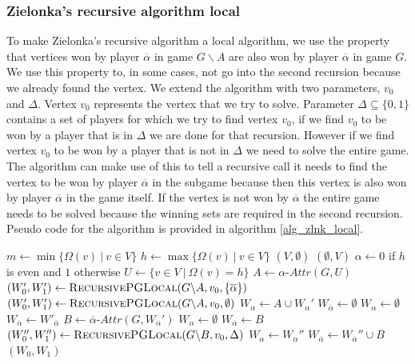 \subsubsection{Zielonka's recursive algorithm local}
\label{sec:zlnk_org_local}
To make Zielonka's recursive algorithm a local algorithm, we use the property that vertices won by player $\overline{\alpha}$ in game $G \backslash A$ are also won by player $\overline{\alpha}$ in game $G$. We use this property to, in some cases, not go into the second recursion because we already found the vertex. We extend the algorithm with two parameters, $v_0$ and $\Delta$. Vertex $v_0$ represents the vertex that we try to solve. Parameter $\Delta \subseteq \{0,1\}$ contains a set of players for which we try to find vertex $v_0$, if we find $v_0$ to be won by a player that is in $\Delta$ we are done for that recursion. However if we find vertex $v_0$ to be won by a player that is not in $\Delta$ we need to solve the entire game. The algorithm can make use of this to tell a recursive call it needs to find the vertex to be won by player $\overline{\alpha}$ in the subgame because then this vertex is also won by player $\overline{\alpha}$ in the game itself. If the vertex is not won by $\overline{\alpha}$ the entire game needs to be solved because the winning sets are required in the second recursion. Pseudo code for the algorithm is provided in algorithm \ref{alg_zlnk_local}.
\begin{algorithm}
	\caption{$\textsc{RecursivePGLocal}(\textit{PG } G = (V,V_0,V_1, E, \Omega),v_0,\Delta)$}
	\label{alg_zlnk_local}
	\begin{algorithmic}[1]
		\State $m \gets \min\{ \Omega(v)\ |\ v \in V\}$
		\State $h \gets\max\{ \Omega(v)\ |\ v \in V\}$
		\State \Return $(V,\emptyset)$
		\Else
		\State \Return $(\emptyset, V)$
		\EndIf
		\EndIf
		\State $\alpha \gets 0$ if $h$ is even and $1$ otherwise
		\State $U \gets \{v \in V\ |\ \Omega(v) = h\}$
		\State $A \gets \alpha\textit{-Attr}(G, U)$
		\If{$\overline{\alpha} \in \Delta$}
		\State $(W_0', W_1') \gets \textsc{RecursivePGLocal}(G \backslash A,v_0,\{\overline{\alpha}\})$
		\Else
		\State $(W_0', W_1') \gets \textsc{RecursivePGLocal}(G \backslash A,v_0,\emptyset)$
		\EndIf
		\State $W_\alpha \gets A \cup W_\alpha'$
		\State $W_{\overline{\alpha}} \gets \emptyset$
		\Else
		\State $W_\alpha \gets \emptyset$
		\State $W_{\overline{\alpha}} \gets W'_{\overline{\alpha}}$
		\Else
		\State $B \gets \overline{\alpha}\textit{-Attr}(G,W_{\overline{\alpha}}')$
		\State $W_\alpha \gets \emptyset$
		\State $W_{\overline{\alpha}} \gets B$
		\Else
		\State $(W_0'', W_1'') \gets \textsc{RecursivePGLocal}(G \backslash B,v_0,\Delta)$
		\State $W_\alpha \gets W_\alpha''$
		\State $W_{\overline{\alpha}} \gets W_{\overline{\alpha}}'' \cup B$
		\EndIf
		\EndIf
		\EndIf
		\State \Return $(W_0, W_1)$
	\end{algorithmic}
\end{algorithm}
